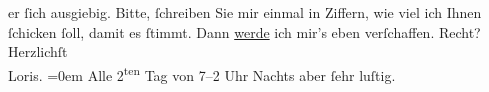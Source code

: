 \begin{ledgroupsized}[t]{13cm}
                    er ſich ausgiebig. Bitte, ſchreiben Sie mir einmal in Ziffern, wie viel ich
                    Ihnen ſchicken ſoll, damit es ſtimmt. Dann \uline{werde}
                    ich mir’s eben verſchaffen. Recht?\pend
           \pstart
           Herzlichſt{\\[\baselineskip]}\spacefill\mbox{Loris.}\pend
           \leftskip=0em{}\pstart
           \noindent{}Alle 2\textsuperscript{ten} Tag \label{K_L00180_1v}\label{K_L00180_1h} von 7–2 Uhr
                        Nachts aber ſehr luſtig.\pend
           \endnumbering{}\end{ledgroupsized}  \newcommand{\dateiname}{L00180}\newcommand{\titel}{Hugo von Hofmannsthal an Arthur Schnitzler, 22. 2. 1893}\newcommand{\editorInnen}{ Martin Anton Müller und Gerd-Hermann Susen}
            \footnotesize
\begin{ledgroupsized}[t]{11.5cm}
\end{ledgroupsized}
         
      